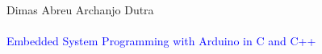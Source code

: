 
\begin{titlingpage}
  \begingroup
  \raggedleft
  \vspace*{\baselineskip}
  {\Large Dimas Abreu Archanjo Dutra}\\[0.167\textheight]
  {\bfseries ~}\\[\baselineskip]
  {\textcolor{Blue}{\Huge Embedded System Programming with Arduino in C and C++}}\\[\baselineskip]
  {\small ~}\par
  \vfill
  \endgroup
\end{titlingpage}

